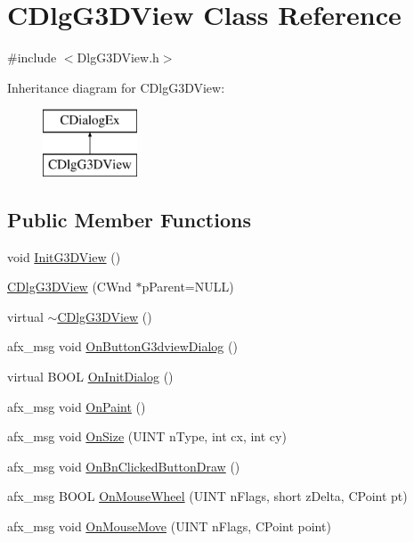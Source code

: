 \hypertarget{class_c_dlg_g3_d_view}{}\section{C\+Dlg\+G3\+D\+View Class Reference}
\label{class_c_dlg_g3_d_view}


{\ttfamily \#include $<$Dlg\+G3\+D\+View.\+h$>$}

Inheritance diagram for C\+Dlg\+G3\+D\+View\+:\begin{figure}[H]
\begin{center}
\leavevmode
\includegraphics[height=2.000000cm]{class_c_dlg_g3_d_view}
\end{center}
\end{figure}
\subsection*{Public Member Functions}
\begin{DoxyCompactItemize}
\item 
void \hyperlink{class_c_dlg_g3_d_view_afb9823f787ba616f03e96a470f21359f}{Init\+G3\+D\+View} ()
\item 
\hyperlink{class_c_dlg_g3_d_view_a71f275c2985290551049dcc038408b49}{C\+Dlg\+G3\+D\+View} (C\+Wnd $\ast$p\+Parent=N\+U\+L\+L)
\item 
virtual \hyperlink{class_c_dlg_g3_d_view_a981382788f123a0632bff0a31b56f4ee}{$\sim$\+C\+Dlg\+G3\+D\+View} ()
\item 
afx\+\_\+msg void \hyperlink{class_c_dlg_g3_d_view_a1d8e75743def6f4bef552c068439bcef}{On\+Button\+G3dview\+Dialog} ()
\item 
virtual B\+O\+O\+L \hyperlink{class_c_dlg_g3_d_view_a72b72a49db688c0a242ce6682aaecee0}{On\+Init\+Dialog} ()
\item 
afx\+\_\+msg void \hyperlink{class_c_dlg_g3_d_view_a10d0b1ebdf7090530e3eaa12ba96e84b}{On\+Paint} ()
\item 
afx\+\_\+msg void \hyperlink{class_c_dlg_g3_d_view_ae247622e0a362eac9b9b3e0fb38e650d}{On\+Size} (U\+I\+N\+T n\+Type, int cx, int cy)
\item 
afx\+\_\+msg void \hyperlink{class_c_dlg_g3_d_view_a15d247d4254d6f69cbd88817a5946516}{On\+Bn\+Clicked\+Button\+Draw} ()
\item 
afx\+\_\+msg B\+O\+O\+L \hyperlink{class_c_dlg_g3_d_view_ad4b834391698f854b722121a55bdf359}{On\+Mouse\+Wheel} (U\+I\+N\+T n\+Flags, short z\+Delta, C\+Point pt)
\item 
afx\+\_\+msg void \hyperlink{class_c_dlg_g3_d_view_aca56c3ff9cae4d952799c9e7f61f03cf}{On\+Mouse\+Move} (U\+I\+N\+T n\+Flags, C\+Point point)
\end{DoxyCompactItemize}
